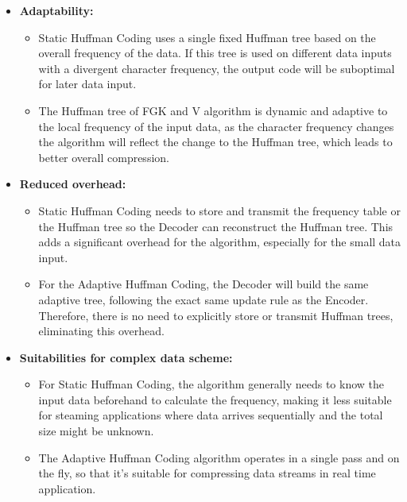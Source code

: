 \begin{enumerate}[label=\textbf{\Alph*.}]
\begin{itemize}
        \item \textbf{Adaptability:}
        \begin{itemize}
            \item Static Huffman Coding uses a single fixed Huffman tree based on the overall frequency of the data. If this tree is used on different data inputs with a divergent character frequency, the output code will be suboptimal for later data input.
            \item The Huffman tree of FGK and V algorithm is dynamic and adaptive to the local frequency of the input data, as the character frequency changes the algorithm will reflect the change to the Huffman tree, which leads to better overall compression.
        \end{itemize}
        \item \textbf{Reduced overhead:}
        \begin{itemize}
            \item Static Huffman Coding needs to store and transmit the frequency table or the Huffman tree so the Decoder can reconstruct the Huffman tree. This adds a significant overhead for the algorithm, especially for the small data input.
            \item For the Adaptive Huffman Coding, the Decoder will build the same adaptive tree, following the exact same update rule as the Encoder. Therefore, there is no need to explicitly store or transmit Huffman trees, eliminating this overhead.
        \end{itemize}
        \item \textbf{Suitabilities for complex data scheme:}
        \begin{itemize}
            \item For Static Huffman Coding, the algorithm generally needs to know the input data beforehand to calculate the frequency, making it less suitable for steaming applications where data arrives sequentially and the total size might be unknown.
            \item The Adaptive Huffman Coding algorithm operates in a single pass and on the fly, so that it’s suitable for compressing data streams in real time application.
        \end{itemize}
    \end{itemize}
\end{enumerate}

